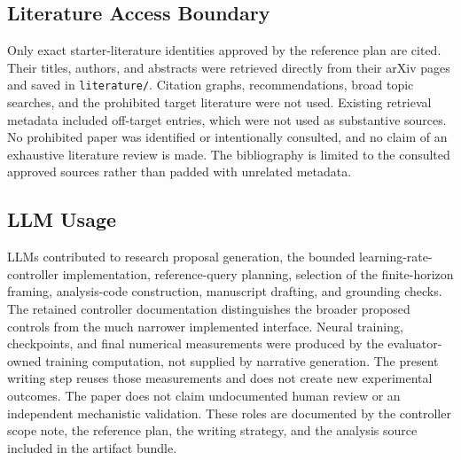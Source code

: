 \documentclass{article}
\begin{document}
\subsection{Literature Access Boundary}

Only exact starter-literature identities approved by the reference plan are cited. Their titles, authors, and abstracts were retrieved directly from their arXiv pages and saved in \texttt{literature/}. Citation graphs, recommendations, broad topic searches, and the prohibited target literature were not used. Existing retrieval metadata included off-target entries, which were not used as substantive sources. No prohibited paper was identified or intentionally consulted, and no claim of an exhaustive literature review is made. The bibliography is limited to the consulted approved sources rather than padded with unrelated metadata.

\subsection{LLM Usage}

LLMs contributed to research proposal generation, the bounded learning-rate-controller implementation, reference-query planning, selection of the finite-horizon framing, analysis-code construction, manuscript drafting, and grounding checks. The retained controller documentation distinguishes the broader proposed controls from the much narrower implemented interface. Neural training, checkpoints, and final numerical measurements were produced by the evaluator-owned training computation, not supplied by narrative generation. The present writing step reuses those measurements and does not create new experimental outcomes. The paper does not claim undocumented human review or an independent mechanistic validation. These roles are documented by the controller scope note, the reference plan, the writing strategy, and the analysis source included in the artifact bundle.
\end{document}
